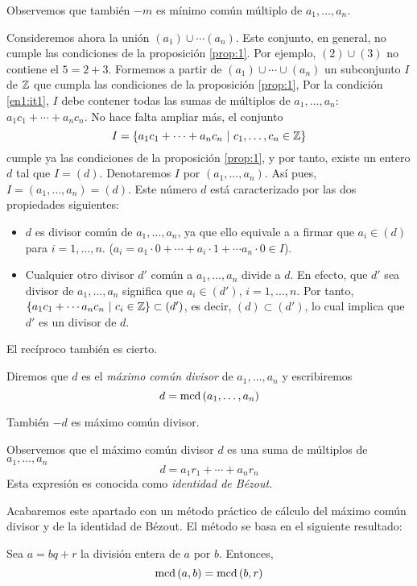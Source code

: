 Observemos que también $-m$ es mínimo común múltiplo de $a_1,\dots,a_n$.

Consideremos ahora la unión $(a_1)\cup\cdots(a_n)$. Este conjunto, en general, no cumple las condiciones de la proposición \ref{prop:1}. Por ejemplo, $(2)\cup (3)$ no contiene el $5=2+3$. Formemos a partir de $(a_1)\cup\cdots\cup (a_n)$ un subconjunto $I$ de $\mathbb{Z}$ que cumpla las condiciones de la proposición \ref{prop:1}, Por la condición \ref{en1:it1}, $I$ debe contener todas las sumas de múltiplos de $a_1,\dots,a_n$: $a_1c_1+\cdots+a_nc_n$. No hace falta ampliar más, el conjunto
$$I=\set{a_1c_1 + \cdots + a_nc_n \ | \ c_1,\dots,c_n\in\ZZ }$$
cumple ya las condiciones de la proposición \ref{prop:1}, y por tanto, existe un entero $d$ tal que $I=(d)$. Denotaremos $I$ por $(a_1,\dots,a_n)$. Así pues, $I=(a_1,\dots,a_n)=(d)$. Este número $d$ está caracterizado por las dos propiedades siguientes:
\begin{itemize}
    \item $d$ es divisor común de $a_1,\dots,a_n$, ya que ello equivale a a firmar que $a_i\in (d)$ para $i=1,\dots,n$. ($a_i=a_1\cdot 0 + \cdots + a_i\cdot 1 + \cdots a_n\cdot 0 \in I$).
    \item Cualquier otro divisor $d'$ común a $a_1,\dots,a_n$ divide a $d$. En efecto, que $d'$ sea divisor de $a_1,\dots,a_n$ significa que $a_i\in (d')$, $i=1,\dots,n$. Por tanto, $\set{a_1c_1+\cdots a_nc_n \ | \ c_i\in\ZZ}\subset (d')$, es decir, $(d)\subset (d')$, lo cual implica que $d'$ es un divisor de $d$.
\end{itemize}
El recíproco también es cierto.

Diremos que $d$ es el {\it máximo común divisor} de $a_1,\dots,a_n$ y escribiremos
$$d=\operatorname{\rm mcd}\left(a_1,\dots,a_n\right)$$

También $-d$ es máximo común divisor.

Observemos que el máximo común divisor $d$ es una suma de múltiplos de $a_1,\dots,a_n$
$$d=a_1r_1+\cdots+a_nr_n$$
Esta expresión es conocida como {\it identidad de Bézout}.

Acabaremos este apartado con un método práctico de cálculo del máximo común divisor y de la identidad de Bézout. El método se basa en el siguiente resultado:

\begin{prop}
    Sea $a=bq+r$ la división entera de $a$ por $b$. Entonces,
    $$\operatorname{\rm mcd}\left(a,b\right)=\operatorname{\rm mcd}\left(b,r\right)$$
\end{prop}
